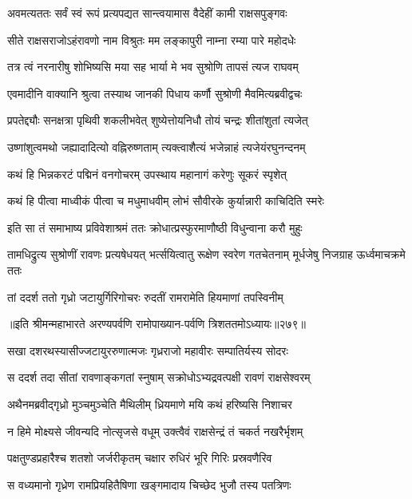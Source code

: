 \twolineshloka
{अवमत्यततः सर्वं स्वं रूपं प्रत्यपद्यत}
{सान्त्वयामास वैदेहीं कामी राक्षसपुङ्गवः}


\twolineshloka
{सीते राक्षसराजोऽहंरावणो नाम विश्रुतः}
{मम लङ्कापुरी नाम्ना रम्या पारे महोदधेः}


\twolineshloka
{तत्र त्वं नरनारीषु शोभिष्यसि मया सह}
{भार्या मे भव सुश्रोणि तापसं त्यज राघवम्}


\twolineshloka
{एवमादीनि वाक्यानि श्रुत्वा तस्याथ जानकी}
{पिधाय कर्णौ सुश्रोणी मैवमित्यब्रवीद्वचः}


\twolineshloka
{प्रपतेद्द्यौः सनक्षत्रा पृथिवी शकलीभवेत्}
{शुष्येत्तोयनिधौ तोयं चन्द्रः शीतांशुतां त्यजेत्}


\twolineshloka
{उष्णांशुत्वमथो जह्यादादित्यो वह्निरुष्णताम्}
{त्यक्त्वाशैत्यं भजेन्नाहं त्यजेयंरघुनन्दनम्}


\twolineshloka
{कथं हि भिन्नकरटं पद्मिनं वनगोचरम्}
{उपस्थाय महानागं करेणुः सूकरं स्पृशेत्}


\twolineshloka
{कथं हि पीत्वा माध्वीकं पीत्वा च मधुमाधवीम्}
{लोभं सौवीरके कुर्यान्नारी काचिदिति स्मरेः}


\twolineshloka
{इति सा तं समाभाष्य प्रविवेशाश्रमं ततः}
{क्रोधात्प्रस्फुरमाणौष्ठी विधुन्वाना करौ मुहुः}


तामधिद्रुत्य सुश्रोणीं रावणः प्रत्यषेधयत्
\twolineshloka
{भर्त्सयित्वातु रूक्षेण स्वरेण गतचेतनाम्}
{मूर्धजेषु निजग्राह ऊर्ध्वमाचक्रमे ततः}


\twolineshloka
{तां ददर्श ततो गृध्रो जटायुर्गिरिगोचरः}
{रुदतीं रामरामेति हियमाणां तपस्विनीम्}


॥इति श्रीमन्महाभारते अरण्यपर्वणि रामोपाख्यान-पर्वणि त्रिशततमोऽध्यायः॥२७९॥




\twolineshloka
{सखा दशरथस्यासीज्जटायुररुणात्मजः}
{गृध्रराजो महावीरः सम्पातिर्यस्य सोदरः}


\twolineshloka
{स ददर्श तदा सीतां रावणाङ्कगतां स्नुषाम्}
{सक्रोधोऽभ्यद्रवत्पक्षी रावणं राक्षसेश्वरम्}


\twolineshloka
{अथैनमब्रवीद्गृध्रो मुञ्चमुञ्चेति मैथिलीम्}
{ध्रियमाणे मयि कथं हरिष्यसि निशाचर}


\twolineshloka
{न हिमे मोक्ष्यसे जीवन्यदि नोत्सृजसे वधूम्}
{उक्त्वैवं राक्षसेन्द्रं तं चकर्त नखरैर्भृशम्}


\twolineshloka
{पक्षतुण्डप्रहारैश्च शतशो जर्जरीकृतम्}
{चक्षार रुधिरं भूरि गिरिः प्रस्रवणैरिव}


\twolineshloka
{स वध्यमानो गृध्रेण रामप्रियहितैषिणा}
{खङ्गमादाय चिच्छेद भुजौ तस्य पतत्रिणः}


